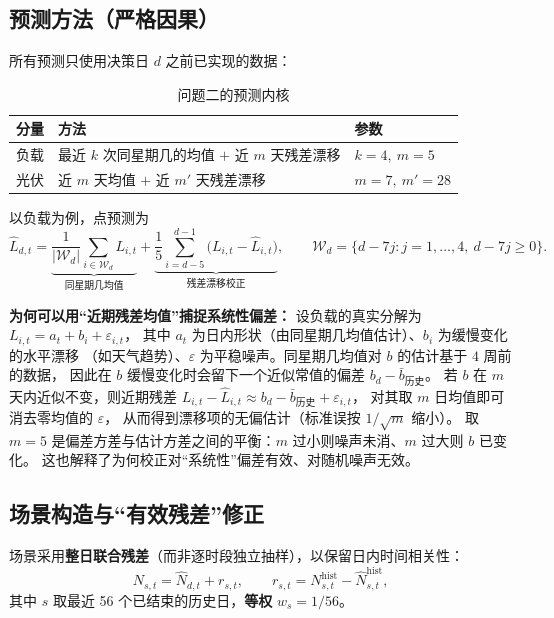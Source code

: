 \subsection{预测方法（严格因果）}
\label{sec:q2-forecast}

所有预测只使用决策日 $d$ 之前已实现的数据：

\begin{table}[H]
\centering
\caption{问题二的预测内核}
\begin{tabular}{@{}l l l@{}}
\toprule
分量 & 方法 & 参数 \\
\midrule
负载 & 最近 $k$ 次同星期几的均值 $+$ 近 $m$ 天残差漂移 & $k=4,\ m=5$ \\
光伏 & 近 $m$ 天均值 $+$ 近 $m'$ 天残差漂移 & $m=7,\ m'=28$ \\
\bottomrule
\end{tabular}
\end{table}

以负载为例，点预测为
\begin{equation}
\hat L_{d,t}=\underbrace{\frac{1}{|\mathcal W_d|}\sum_{i\in\mathcal W_d}L_{i,t}}_{\text{同星期几均值}}
+\underbrace{\frac{1}{5}\sum_{i=d-5}^{d-1}\bigl(L_{i,t}-\hat L_{i,t}\bigr)}_{\text{残差漂移校正}},
\qquad \mathcal W_d=\{d-7j: j=1,\dots,4,\ d-7j\ge0\}.
\end{equation}

\textbf{为何可以用“近期残差均值”捕捉系统性偏差：}
设负载的真实分解为 $L_{i,t}=a_t+b_i+\varepsilon_{i,t}$，
其中 $a_t$ 为日内形状（由同星期几均值估计）、$b_i$ 为缓慢变化的水平漂移
（如天气趋势）、$\varepsilon$ 为平稳噪声。同星期几均值对 $b$ 的估计基于 $4$ 周前的数据，
因此在 $b$ 缓慢变化时会留下一个近似常值的偏差 $b_d-\bar b_{\text{历史}}$。
若 $b$ 在 $m$ 天内近似不变，则近期残差
$L_{i,t}-\hat L_{i,t}\approx b_d-\bar b_{\text{历史}}+\varepsilon_{i,t}$，
对其取 $m$ 日均值即可消去零均值的 $\varepsilon$，
从而得到漂移项的无偏估计（标准误按 $1/\sqrt m$ 缩小）。
取 $m=5$ 是偏差方差与估计方差之间的平衡：$m$ 过小则噪声未消、$m$ 过大则 $b$ 已变化。
这也解释了为何校正对“系统性”偏差有效、对随机噪声无效。

\subsection{场景构造与“有效残差”修正}
\label{sec:q2-scen}

场景采用\textbf{整日联合残差}（而非逐时段独立抽样），以保留日内时间相关性：
\begin{equation}
N_{s,t}=\hat N_{d,t}+r_{s,t},\qquad r_{s,t}=N_{s,t}^{\text{hist}}-\hat N_{s,t}^{\text{hist}},
\end{equation}
其中 $s$ 取最近 56 个已结束的历史日，\textbf{等权} $w_s=1/56$。

